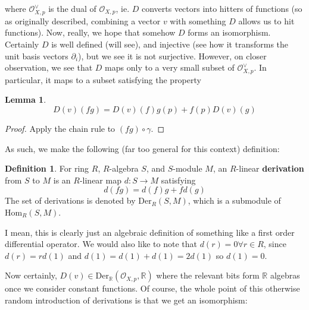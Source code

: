 \documentclass{article}
\theoremstyle{definition}
\newtheorem{definition}{Definition}
\newtheorem{lemma}{Lemma}
\begin{document}
where $\mathcal{O}^\vee_{X, p}$ is the dual of $\mathcal{O}_{X, p}$, ie. $D$
converts vectors into hitters of functions (so as originally described,
combining a vector $v$ with something $D$ allows us to hit functions). Now,
really, we hope that somehow $D$ forms an isomorphism. Certainly $D$ is well
defined (will see), and injective (see how it transforms the unit basis vectors
$\partial_i$), but we see it is not surjective. However, on closer observation,
we see that $D$ maps only to a very small subset of $\mathcal{O}^\vee_{X, p}$.
In particular, it maps to a subset satisfying the property

\begin{lemma}
$$ D(v)(fg) = D(v)(f) g(p) + f(p) D(v)(g) $$
\end{lemma}
\begin{proof}
Apply the chain rule to $(fg) \circ \gamma$.
\end{proof}

As such, we make the following (far too general for this context) definition:

\begin{definition}
For ring $R$, $R$-algebra $S$, and $S$-module $M$, an $R$-linear
\textbf{derivation} from $S$ to $M$ is an $R$-linear map $d: S \to M$ satisfying 
$$ d(fg) = d(f)g + fd(g) $$
The set of derivations is denoted by $\text{Der}_R(S, M)$, which is a submodule
of $\text{Hom}_R(S, M)$.
\end{definition}

I mean, this is clearly just an algebraic definition of something like a first
order differential operator. We would also like to note that $d(r) = 0 \forall r
\in R$, since $d(r) = rd(1)$ and $d(1) = d(1) + d(1) = 2d(1)$ so $d(1) = 0$.

Now certainly, $D(v) \in \text{Der}_\mathbb{R}(\mathcal{O}_{X, p}, \mathbb{R})$
where the relevant bits form $\mathbb{R}$ algebras once we consider constant
functions. Of course, the whole point of this otherwise random introduction of
derivations is that we get an isomorphism:
\end{document}
